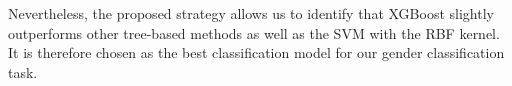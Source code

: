Nevertheless, the proposed strategy allows us to identify that XGBoost slightly outperforms other tree-based methods as well as the SVM with the RBF kernel. It is therefore chosen as the best classification model for our gender classification task. 
